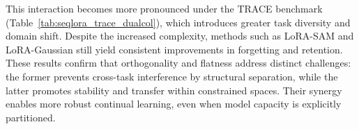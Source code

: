 \documentclass[letterpaper]{article} %
\begin{document}
This interaction becomes more pronounced under the TRACE benchmark (Table~\ref{tab:seqlora_trace_dualcol}), which introduces greater task diversity and domain shift. Despite the increased complexity, methods such as LoRA-SAM and LoRA-Gaussian still yield consistent improvements in forgetting and retention. These results confirm that orthogonality and flatness address distinct challenges: the former prevents cross-task interference by structural separation, while the latter promotes stability and transfer within constrained spaces. Their synergy enables more robust continual learning, even when model capacity is explicitly partitioned.







\end{document}
